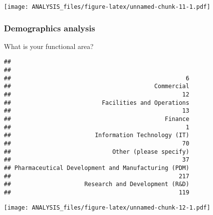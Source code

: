 \documentclass[]{article}
\newenvironment{Shaded}{\begin{snugshade}}{\end{snugshade}}
\newcommand{\KeywordTok}[1]{\textcolor[rgb]{0.13,0.29,0.53}{\textbf{#1}}}
\newcommand{\DataTypeTok}[1]{\textcolor[rgb]{0.13,0.29,0.53}{#1}}
\newcommand{\DecValTok}[1]{\textcolor[rgb]{0.00,0.00,0.81}{#1}}
\newcommand{\FloatTok}[1]{\textcolor[rgb]{0.00,0.00,0.81}{#1}}
\newcommand{\StringTok}[1]{\textcolor[rgb]{0.31,0.60,0.02}{#1}}
\newcommand{\OperatorTok}[1]{\textcolor[rgb]{0.81,0.36,0.00}{\textbf{#1}}}
\newcommand{\NormalTok}[1]{#1}
\begin{document}
\texttt{[image: ANALYSIS\_files/figure-latex/unnamed-chunk-11-1.pdf]}

\subsubsection{Demographics analysis}\label{demographics-analysis}

What is your functional area?

\begin{Shaded}
\end{Shaded}

\begin{verbatim}
## 
##                                                    
##                                                  6 
##                                         Commercial 
##                                                 12 
##                          Facilities and Operations 
##                                                 13 
##                                            Finance 
##                                                  1 
##                        Information Technology (IT) 
##                                                 70 
##                             Other (please specify) 
##                                                 37 
## Pharmaceutical Development and Manufacturing (PDM) 
##                                                217 
##                     Research and Development (R&D) 
##                                                119
\end{verbatim}

\begin{Shaded}
\end{Shaded}

\texttt{[image: ANALYSIS\_files/figure-latex/unnamed-chunk-12-1.pdf]}
\end{document}
